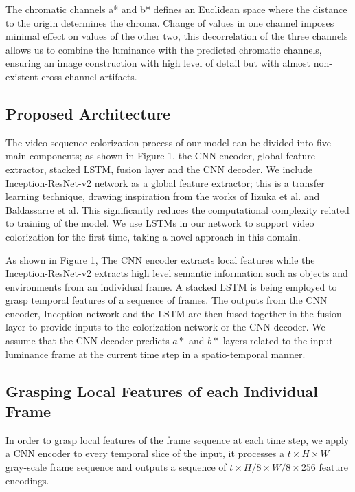 \documentclass[10pt,twocolumn,letterpaper]{article}
\begin{document}
The chromatic channels a* and b* defines an Euclidean space where the distance to the origin determines the chroma. Change of values in one channel imposes minimal effect on values of the other two, this decorrelation of the three channels allows us to combine the luminance with the predicted chromatic channels, ensuring an image construction with high level of detail but with almost non-existent cross-channel artifacts.

\subsection{Proposed Architecture}

The video sequence colorization process of our model can be divided into five main components; as shown in Figure 1, the CNN encoder, global feature extractor, stacked LSTM, fusion layer and the CNN decoder. We include Inception-ResNet-v2 network as a global feature extractor; this is a transfer learning technique, drawing inspiration from the works of Iizuka et al. and Baldassarre et al. This significantly reduces the computational complexity related to training of the model. We use LSTMs in our network to support video colorization for the first time, taking a novel approach in this domain. 

As shown in Figure 1, The CNN encoder extracts local features while the Inception-ResNet-v2 extracts high level semantic information such as objects and environments from an individual frame. A stacked LSTM is being employed to grasp temporal features of a sequence of frames. The outputs from the CNN encoder, Inception network and the LSTM are then fused together in the fusion layer to provide inputs to the colorization network or the CNN decoder. We assume that the CNN decoder predicts $a*$ and $b*$ layers related to the input luminance frame at the current time step in a spatio-temporal manner.

\subsection{Grasping Local Features of each Individual Frame}
In order to grasp local features of the frame sequence at each time step, we apply a CNN encoder to every temporal slice of the input, it processes a $t\times H\times W$ gray-scale frame sequence and outputs a sequence of $t\times H/8\times W/8\times 256$ feature encodings.
\end{document}
